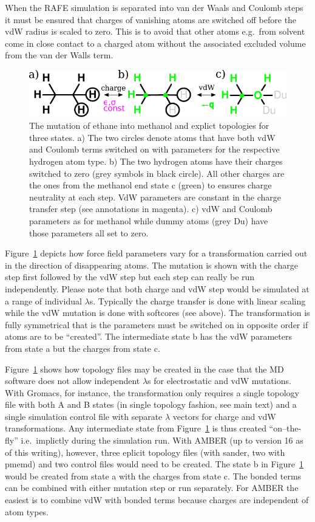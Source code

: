 \documentclass[journal=jctcce,manuscript=suppinfo]{achemso}
\begin{document}
When the RAFE simulation is separated into van der Waals and Coulomb
steps it must be ensured that charges of vanishing atoms are switched
off before the vdW radius is scaled to zero.  This is to avoid that
other atoms e.g.\ from solvent come in close contact to a charged atom
without the associated excluded volume from the van der Walls term.

\begin{figure}[ht]
\includegraphics[scale=1.0]{figures/dummies.pdf}
\caption{The mutation of ethane into methanol and explict topologies
  for three states. a) The two circles denote atoms that have both vdW
  and Coulomb terms switched on with parameters for the respective
  hydrogen atom type.  b) The two hydrogen atoms have their charges
  switched to zero (grey symbols in black circle).  All other charges
  are the ones from the methanol end state c (green) to ensures charge
  neutrality at each step.  VdW parameters are constant in the charge
  transfer step (see annotations in magenta).  c) vdW and Coulomb
  parameters as for methanol while dummy atoms (grey Du) have those
  parameters all set to zero.}
\label{fig:dummies}
\end{figure}

Figure~\ref{fig:dummies} depicts how force field parameters vary for a
transformation carried out in the direction of disappearing atoms.
The mutation is shown with the charge step first followed by the vdW
step but each step can really be run independently.  Please note that
both charge and vdW step would be simulated at a range of individual
$\lambda$s.  Typically the charge transfer is done with linear scaling
while the vdW mutation is done with softcores (see above).  The
transformation is fully symmetrical that is the parameters must be
switched on in opposite order if atoms are to be ``created''.  The
intermediate state b has the vdW parameters from state a but the
charges from state c.

Figure~\ref{fig:dummies} shows how topology files may be created in
the case that the MD software does not allow independent $\lambda$s
for electrostatic and vdW mutations.  With Gromacs, for instance, the
transformation only requires a single topology file with both A and B
states (in single topology fashion, see main text) and a single
simulation control file with separate $\lambda$ vectors for charge and
vdW transformations.  Any intermediate state from
Figure~\ref{fig:dummies} is thus created ``on--the-fly'' i.e.\
implictly during the simulation run.  With AMBER (up to version 16 as
of this writing), however, three eplicit topology files (with sander,
two with pmemd) and two control files would need to be created.  The
state b in Figure~\ref{fig:dummies} would be created from state a with
the charges from state c.  The bonded terms can be combined with
either mutation step or run separately.  For AMBER the easiest is to
combine vdW with bonded terms because charges are independent of atom
types.
\end{document}
